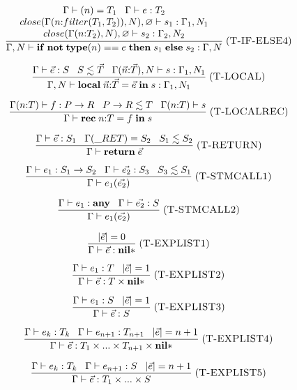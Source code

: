 \[
\frac{\begin{array}{c}
      \Gamma \vdash(n) = T_{1} \;\;\; \Gamma \vdash e:T_{2}\\
      close(\Gamma(n{:}filter(T_{1}, T_{2})), N), \varnothing \vdash s_{1} : \Gamma_{1}, N_{1}\\
      close(\Gamma(n{:}T_{2}), N), \varnothing \vdash s_{2} : \Gamma_{2}, N_{2}
      \end{array}}
     {\Gamma, N \vdash \mathbf{if} \; \mathbf{not} \; \mathbf{type}(n) == e \; \mathbf{then} \; s_{1} \; \mathbf{else} \; s_{2} : \Gamma, N}
\; (\textsc{T-IF-ELSE4})
\]

\[
\frac{\Gamma \vdash \vec{e}:S \;\;\; S \lesssim \vec{T} \;\;\;
      \Gamma(\vec{n}{:}\vec{T}), N \vdash s : \Gamma_{1}, N_{1}}
     {\Gamma, N \vdash \mathbf{local} \; \vec{n}{:}\vec{T} = \vec{e} \; \mathbf{in} \; s : \Gamma_{1}, N_{1}}
\; (\textsc{T-LOCAL})
\]

\[
\frac{\Gamma(n{:}T) \vdash f:P \rightarrow R \;\;\; P \rightarrow R \lesssim T \;\;\;
      \Gamma(n{:}T) \vdash s}
     {\Gamma \vdash \mathbf{rec} \; n{:}T = f \; \mathbf{in} \; s}
\; (\textsc{T-LOCALREC})
\]

\[
\frac{\env \vdash \vec{e}:S_{1} \;\;\;
      \env(\ret) = S_{2} \;\;\;
      S_{1} \lesssim S_{2}}
     {\env \vdash \mathbf{return} \; \vec{e}}
\mylabel{T-RETURN}
\]

\[
\frac{\Gamma \vdash e_{1}:S_{1} \rightarrow S_{2} \;\;\;
      \Gamma \vdash \vec{e_{2}}:S_{3} \;\;\;
      S_{3} \lesssim S_{1}}
     {\Gamma \vdash e_{1}(\vec{e_{2}})}
\; (\textsc{T-STMCALL1})
\]

\[
\frac{\Gamma \vdash e_{1}:\mathbf{any} \;\;\;
      \Gamma \vdash \vec{e_{2}}:S}
     {\Gamma \vdash e_{1}(\vec{e_{2}})}
\; (\textsc{T-STMCALL2})
\]

\[
\frac{|\vec{e}| = 0}
     {\Gamma \vdash \vec{e} : \mathbf{nil}{*}}
\; (\textsc{T-EXPLIST1})
\]

\[
\frac{\Gamma \vdash e_{1}:T \;\;\;
      |\vec{e}| = 1}
     {\Gamma \vdash \vec{e} : T \times \mathbf{nil}{*}}
\; (\textsc{T-EXPLIST2})
\]

\[
\frac{\Gamma \vdash e_{1}:S \;\;\;
      |\vec{e}| = 1}
     {\Gamma \vdash \vec{e} : S}
\; (\textsc{T-EXPLIST3})
\]

\[
\frac{\Gamma \vdash e_{k}:T_{k} \;\;\;
      \Gamma \vdash e_{n+1}:T_{n+1} \;\;\;
      |\vec{e}| = n + 1}
     {\Gamma \vdash \vec{e} : T_{1} \times ... \times T_{n+1} \times \mathbf{nil}{*}}
\; (\textsc{T-EXPLIST4})
\]

\[
\frac{\Gamma \vdash e_{k}:T_{k} \;\;\;
      \Gamma \vdash e_{n+1}:S \;\;\;
      |\vec{e}| = n + 1}
     {\Gamma \vdash \vec{e} : T_{1} \times ... \times S}
\; (\textsc{T-EXPLIST5})
\]

